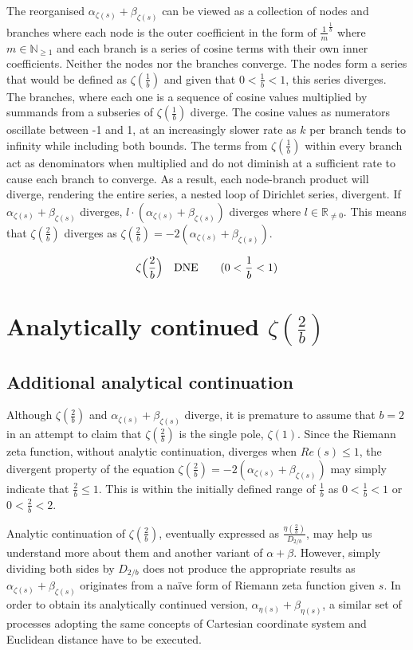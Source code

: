 \documentclass{amsart}
\begin{document}
	The reorganised $\alpha_{\zeta(s)} + \beta_{\zeta(s)}$ can be viewed as a collection of nodes and branches where each node is the outer coefficient in the form of $\frac{1}{m}^{\frac{1}{b}}$ where $m \in \mathbb{N}_{\geq 1}$ and each branch is a series of cosine terms with their own inner coefficients. Neither the nodes nor the branches converge. The nodes form a series that would be defined as $\zeta(\frac{1}{b})$ and given that $0 < \frac{1}{b} < 1$, this series diverges. The branches, where each one is a sequence of cosine values multiplied by summands from a subseries of $\zeta(\frac{1}{b})$ diverge. The cosine values as numerators oscillate between -1 and 1, at an increasingly slower rate as $k$ per branch tends to infinity while including both bounds. The terms from $\zeta(\frac{1}{b})$ within every branch act as denominators when multiplied and do not diminish at a sufficient rate to cause each branch to converge. As a result, each node-branch product will diverge, rendering the entire series, a nested loop of Dirichlet series, divergent. If $\alpha_{\zeta(s)} + \beta_{\zeta(s)}$ diverges, $l {\cdot} (\alpha_{\zeta(s)} + \beta_{\zeta(s)})$ diverges where $l \in \mathbb{R}_{\neq 0}$. This means that $\zeta(\frac{2}{b})$ diverges as $\zeta(\frac{2}{b}) = -2(\alpha_{\zeta(s)} + \beta_{\zeta(s)})$. 
	
	\[ \zeta\Bigl( \frac{2}{b} \Bigr) \quad \text{DNE} \qquad (0 < \frac{1}{b} < 1) \]
	
	
	\section{Analytically continued $\zeta(\frac{2}{b})$}
	\subsection{Additional analytical continuation}
	Although $\zeta(\frac{2}{b})$ and $\alpha_{\zeta(s)} + \beta_{\zeta(s)}$ diverge, it is premature to assume that $b=2$ in an attempt to claim that $\zeta(\frac{2}{b})$ is the single pole, $\zeta(1)$. Since the Riemann zeta function, without analytic continuation, diverges when $Re(s) \leq 1$, the divergent property of the equation $\zeta(\frac{2}{b}) = -2(\alpha_{\zeta(s)} + \beta_{\zeta(s)})$ may simply indicate that $\frac{2}{b} \leq 1$. This is within the initially defined range of $\frac{1}{b}$ as $0 < \frac{1}{b} < 1$ or $0 < \frac{2}{b} < 2$.
	
	Analytic continuation of $\zeta(\frac{2}{b})$, eventually expressed as $\frac{\eta(\frac{2}{b})}{D_{2/b}}$, may help us understand more about them and another variant of $\alpha + \beta$. However, simply dividing both sides by $D_{2/b}$ does not produce the appropriate results as $\alpha_{\zeta(s)} + \beta_{\zeta(s)}$ originates from a naïve form of Riemann zeta function given $s$. In order to obtain its analytically continued version, $\alpha_{\eta(s)} + \beta_{\eta(s)}$, a similar set of processes adopting the same concepts of Cartesian coordinate system and Euclidean distance have to be executed.
	
\end{document}
